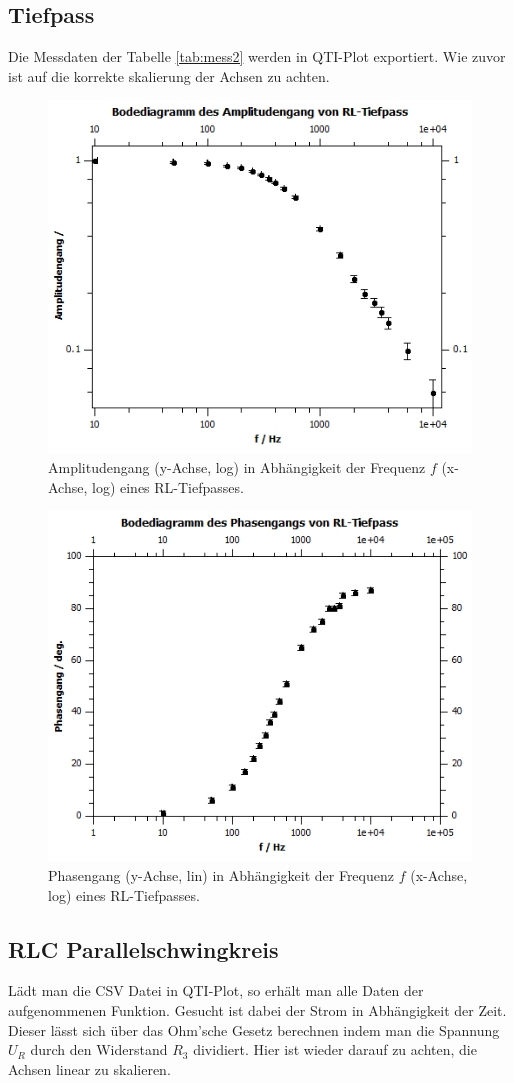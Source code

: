 \documentclass[12pt,a4paper,twoside]{article}
\begin{document}
\subsection{Tiefpass}
Die Messdaten der Tabelle \ref{tab:mess2} werden in QTI-Plot exportiert. 
Wie zuvor ist auf die korrekte skalierung der Achsen zu achten. 

\begin{figure}[H]
    \centering
    \includegraphics[width=0.6\linewidth]{nudes/Plot a2 amp.jpg}
    \caption{Amplitudengang (y-Achse, log) in Abhängigkeit der Frequenz $f$ (x-Achse, log) eines RL-Tiefpasses. }
    \label{fig:plot a2 amp} 
\end{figure}

\begin{figure}[H]
    \centering
    \includegraphics[width=0.6\linewidth]{nudes/Plot a2 ph.jpg}
    \caption{Phasengang (y-Achse, lin) in Abhängigkeit der Frequenz $f$ (x-Achse, log) eines RL-Tiefpasses. }
    \label{fig:plot a2 ph} 
\end{figure}

\subsection{RLC Parallelschwingkreis}
Lädt man die CSV Datei in QTI-Plot, so erhält man alle Daten der aufgenommenen Funktion. 
Gesucht ist dabei der Strom in Abhängigkeit der Zeit. Dieser lässt sich über das Ohm'sche Gesetz berechnen indem man die Spannung $U_R$ durch den Widerstand $R_3$ dividiert. 
Hier ist wieder darauf zu achten, die Achsen linear zu skalieren. 
\end{document}
